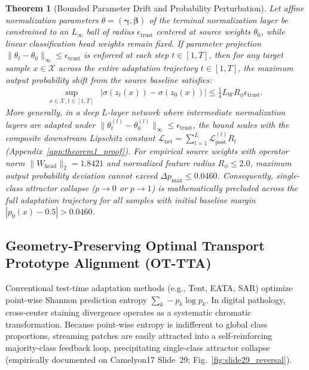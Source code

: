 \documentclass[journal]{IEEEtran}
\newtheorem{theorem}{Theorem}
\begin{document}
\begin{theorem}[Bounded Parameter Drift and Probability Perturbation]
\label{thm:drift_bound}
Let affine normalization parameters $\theta = (\boldsymbol{\gamma}, \boldsymbol{\beta})$ of the terminal normalization layer be constrained to an $L_\infty$ ball of radius $\epsilon_{\mathrm{trust}}$ centered at source weights $\theta_0$, while linear classification head weights remain fixed. If parameter projection $\|\theta_t - \theta_0\|_\infty \le \epsilon_{\mathrm{trust}}$ is enforced at each step $t \in [1, T]$, then for any target sample $x \in \mathcal{X}$ across the entire adaptation trajectory $t \in [1, T]$, the maximum output probability shift from the source baseline satisfies:
\begin{equation}
\label{eq:theorem1_bound}
\begin{aligned}
\sup_{x \in \mathcal{X}, t \in [1, T]} &|\sigma(z_t(x)) - \sigma(z_0(x))| \le \frac{1}{4} L_W R_\phi \epsilon_{\mathrm{trust}}.
\end{aligned}
\end{equation}
More generally, in a deep $L$-layer network where intermediate normalization layers are adapted under $\|\theta_t^{(l)} - \theta_0^{(l)}\|_\infty \le \epsilon_{\mathrm{trust}}$, the bound scales with the composite downstream Lipschitz constant $\mathcal{L}_{\mathrm{net}} = \sum_{l=1}^L \mathcal{L}_{\mathrm{post}}^{(l)} R_l$ (Appendix~\ref{app:theorem1_proof}). For empirical source weights with operator norm $\|W_{\mathrm{head}}\|_2 = 1.8421$ and normalized feature radius $R_\phi \le 2.0$, maximum output probability deviation cannot exceed $\Delta p_{\max} \le 0.0460$. Consequently, single-class attractor collapse ($p \to 0$ or $p \to 1$) is mathematically precluded across the full adaptation trajectory for all samples with initial baseline margin $|p_0(x) - 0.5| > 0.0460$.
\end{theorem}

\subsection{Geometry-Preserving Optimal Transport Prototype Alignment (OT-TTA)}
\label{sec:ot_tta}
Conventional test-time adaptation methods (e.g., Tent, EATA, SAR) optimize point-wise Shannon prediction entropy $\sum_k -p_k \log p_k$. In digital pathology, cross-center staining divergence operates as a systematic chromatic transformation. Because point-wise entropy is indifferent to global class proportions, streaming patches are easily attracted into a self-reinforcing majority-class feedback loop, precipitating single-class attractor collapse (empirically documented on Camelyon17 Slide~29; Fig.~\ref{fig:slide29_reversal}).
\end{document}
